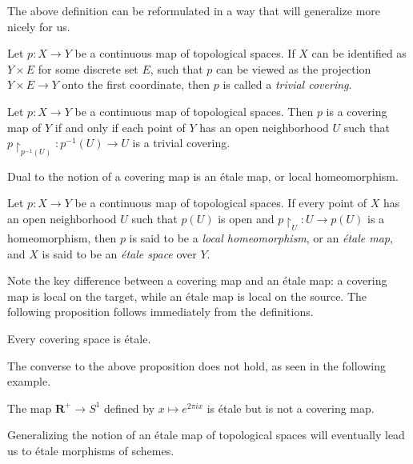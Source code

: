 \documentclass[11pt,openany]{book} %
\newcommand{\R}{\mathbf{R}}
\begin{document}
The above definition can be reformulated in a way that will generalize more nicely for us.\\

\begin{definition}
Let $p : X \to Y$ be a continuous map of topological spaces. If $X$ can be identified as $Y \times E$ for some discrete set $E$, such that $p$ can be viewed as the projection $Y \times E \to Y$ onto the first coordinate, then $p$ is called a \emph{trivial covering}.
\end{definition}

\begin{proposition}
Let $p : X \to Y$ be a continuous map of topological spaces. Then $p$ is a covering map of $Y$ if and only if each point of $Y$ has an open neighborhood $U$ such that $p\restriction_{p^{-1}(U)} : p^{-1}(U) \to U$ is a trivial covering.
\end{proposition}
\medskip

Dual to the notion of a covering map is an \'etale map, or local homeomorphism.\\

\begin{definition}
Let $p : X \to Y$ be a continuous map of topological spaces. If every point of $X$ has an open neighborhood $U$ such that $p(U)$ is open and $p\restriction_U : U \to p(U)$ is a homeomorphism, then $p$ is said to be a \emph{local homeomorphism}, or an \emph{\'etale map}, and $X$ is said to be an \emph{\'etale space} over $Y$.
\end{definition}

Note the key difference between a covering map and an \'etale map: a covering map is local on the target, while an \'etale map is local on the source. The following proposition follows immediately from the definitions.\\

\begin{proposition}
Every covering space is \'etale.
\end{proposition}
\medskip

The converse to the above proposition does not hold, as seen in the following example.\\

\begin{example}
The map $\R^+ \to S^1$ defined by $x \mapsto e^{2\pi i x}$ is \'etale but is not a covering map.
\end{example}

Generalizing the notion of an \'etale map of topological spaces will eventually lead us to \'etale morphisms of schemes.
\end{document}
